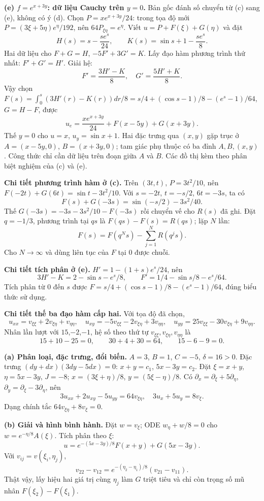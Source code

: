 \textbf{(e) $f=e^{x+3y}$: dữ liệu Cauchy trên $y=0$.} Bản gốc đánh số chuyển từ (c) sang (e), không có ý (d). Chọn $P=xe^{x+3y}/24$: trong tọa độ mới $P=(3\xi+5\eta)e^\eta/192$, nên $64P_{\xi\eta}=e^\eta$. Viết $u=P+F(\xi)+G(\eta)$ và đặt
\[H(s)=s-\frac{se^s}{24},\qquad K(s)=\sin s+1-\frac{se^s}{8}.\]
Hai dữ liệu cho $F+G=H$, $-5F'+3G'=K$. Lấy đạo hàm phương trình thứ nhất: $F'+G'=H'$. Giải hệ:
\[F'=\frac{3H'-K}{8},\quad G'=\frac{5H'+K}{8}.\]
Vậy chọn $F(s)=\int_0^s(3H'(r)-K(r))dr/8=s/4+(\cos s-1)/8-(e^s-1)/64$, $G=H-F$, được
\[\boxed{u_e=\frac{xe^{x+3y}}{24}+F(x-5y)+G(x+3y).}\]
Thế $y=0$ cho $u=x$, $u_y=\sin x+1$. Hai đặc trưng qua $(x,y)$ gặp trục ở $A=(x-5y,0)$, $B=(x+3y,0)$; tam giác phụ thuộc có ba đỉnh $A,B,(x,y)$. Công thức chỉ cần dữ liệu trên đoạn giữa $A$ và $B$. Các đồ thị kèm theo phân biệt nghiệm của (c) và (e).

\textbf{Chi tiết phương trình hàm ở (c).} Trên $(3t,t)$, $P=3t^2/10$, nên $F(-2t)+G(6t)=\sin t-3t^2/10$. Với $s=-2t$, $t=-s/2$, $6t=-3s$, ta có
\[F(s)+G(-3s)=\sin(-s/2)-3s^2/40.\]
Thế $G(-3s)=-3s-3s^2/10-F(-3s)$ rồi chuyển vế cho $R(s)$ đã ghi. Đặt $q=-1/3$, phương trình tại $qs$ là $F(qs)-F(s)=R(qs)$; lặp $N$ lần:
\[F(s)=F(q^Ns)-\sum_{j=1}^{N}R(q^js).\]
Cho $N\to\infty$ và dùng liên tục của $F$ tại $0$ được chuỗi.

\textbf{Chi tiết tích phân ở (e).} $H'=1-(1+s)e^s/24$, nên
\[3H'-K=2-\sin s-e^s/8,\qquad F'=1/4-\sin s/8-e^s/64.\]
Tích phân từ $0$ đến $s$ được $F=s/4+(\cos s-1)/8-(e^s-1)/64$, đúng biểu thức sử dụng.

\textbf{Chi tiết thế ba đạo hàm cấp hai.} Với tọa độ đã chọn,
\[u_{xx}=v_{\xi\xi}+2v_{\xi\eta}+v_{\eta\eta},\quad u_{xy}=-5v_{\xi\xi}-2v_{\xi\eta}+3v_{\eta\eta},\quad u_{yy}=25v_{\xi\xi}-30v_{\xi\eta}+9v_{\eta\eta}.\]
Nhân lần lượt với $15$,$-2$,$-1$, hệ số theo thứ tự $v_{\xi\xi},v_{\xi\eta},v_{\eta\eta}$ là
\[15+10-25=0,\qquad 30+4+30=64,\qquad 15-6-9=0.\]

\textbf{(a) Phân loại, đặc trưng, đổi biến.} $A=3$, $B=1$, $C=-5$, $\delta=16>0$. Đặc trưng $(dy+dx)(3dy-5dx)=0$: $x+y=c_1$, $5x-3y=c_2$. Đặt $\xi=x+y$, $\eta=5x-3y$, $J=-8$; $x=(3\xi+\eta)/8$, $y=(5\xi-\eta)/8$. Có $\partial_x=\partial_\xi+5\partial_\eta$, $\partial_y=\partial_\xi-3\partial_\eta$, nên
\[3u_{xx}+2u_{xy}-5u_{yy}=64v_{\xi\eta},\quad 3u_x+5u_y=8v_\xi.\]
Dạng chính tắc $64v_{\xi\eta}+8v_\xi=0$.

\textbf{(b) Giải và hình bình hành.} Đặt $w=v_\xi$; ODE $w_\eta+w/8=0$ cho $w=e^{-\eta/8}A(\xi)$. Tích phân theo $\xi$:
\[\boxed{u=e^{-(5x-3y)/8}F(x+y)+G(5x-3y).}\]
Với $v_{ij}=v(\xi_i,\eta_j)$,
\[v_{22}-v_{12}=e^{-(\eta_2-\eta_1)/8}(v_{21}-v_{11}).\]
Thật vậy, lấy hiệu hai giá trị cùng $\eta_j$ làm $G$ triệt tiêu và chỉ còn trọng số mũ nhân $F(\xi_2)-F(\xi_1)$.

